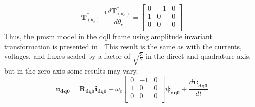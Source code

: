 \begin{equation}
	{\mathbf{T}^*_{(\theta_e)}}^{-1}\frac{d\mathbf{T}^*_{(\theta_e)}}{d\theta_e} =
	\begin{bmatrix}
		0 & -1 & 0 \\
		1 & 0  & 0 \\
		0 & 0  & 0 \\
	\end{bmatrix}
	\label{eq:transformation_derivative_ampl_result}
\end{equation}
Thus, the \gls{pmsm} model in the dq0 frame using amplitude invariant transformation is presented in . This result is the same as with the currents, voltages, and fluxes scaled by a factor of $\sqrt{\frac{3}{2}}$ in the direct and quadrature axis, but in the zero axis some results may vary.
\begin{equation}
	\mathbf{u_{dq0}}
	=
	\mathbf{R_{dq0}}\mathbf{i_{dq0}}
	+\omega_e	\begin{bmatrix}
		0 & -1 & 0 \\
		1 & 0  & 0 \\
		0 & 0  & 0 \\
	\end{bmatrix}
	\pmb{\psi_{dq0}}
	+\frac{d \pmb{\psi_{dq0}}}{dt}
	\label{eq:flx_voltage_balance_dq0_amplitude}
\end{equation}